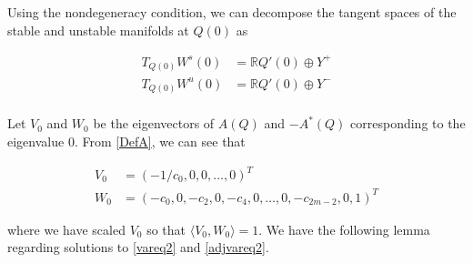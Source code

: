 \documentclass[12pt]{article}
\def\R{{\mathbb R}}
\begin{document}
Using the nondegeneracy condition, we can decompose the tangent spaces of the stable and unstable manifolds at $Q(0)$ as

\begin{align*}
T_{Q(0)}W^s(0) &= \R Q'(0) \oplus Y^+ \\
T_{Q(0)}W^u(0) &= \R Q'(0) \oplus Y^- \\
\end{align*}

Let $V_0$ and $W_0$ be the eigenvectors of $A(Q)$ and $-A^*(Q)$ corresponding to the eigenvalue 0. From \eqref{DefA}, we can see that

\begin{align}
V_0 &= (-1/c_0, 0, 0, \dots, 0)^T \label{V0} \\
W_0 &= (-c_0, 0, -c_2, 0, -c_4, 0, \dots, 0, -c_{2m-2}, 0, 1)^T \label{W0}
\end{align}

where we have scaled $V_0$ so that $\langle V_0, W_0 \rangle = 1$. We have the following lemma regarding solutions to \eqref{vareq2} and \eqref{adjvareq2}.
\end{document}
